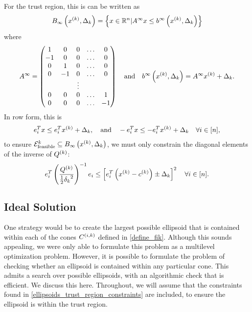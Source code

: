For the trust region, this is can be written as
\begin{align*}
{ B_{\infty}\left(x^{(k)}, \Delta_k\right) } = \left\{ x \in \mathbb R^n | A^{\infty} x\le b^{\infty}\left(x^{(k)}, \Delta_k\right) \right\}
\end{align*}
where
\begin{align}
A^{\infty} = \begin{pmatrix}
 1 &  0 & 0      & \ldots &  0 \\
-1 &  0 & 0      & \ldots &  0 \\
 0 &  1 & 0      & \ldots &  0 \\
 0 & -1 & 0      & \ldots &  0 \\
   &    & \vdots &        &    \\
 0 &  0 &      0 & \ldots &  1 \\
 0 &  0 &      0 & \ldots & -1 \\
\end{pmatrix} \quad \textrm{and} \quad
b^{\infty}\left(x^{(k)}, \Delta_k\right) = A^{\infty} x^{(k)} + \Delta_k. \label{define_atr}
\end{align}
In row form, this is
\begin{align*}
e_i ^T x \le e_i^Tx^{(k)} + \Delta_k, \quad \textrm{and} \quad
-e_i ^T x \le -e_i^Tx^{(k)} + \Delta_k \quad \forall i \in [n],
\end{align*}
to ensure ${\mathcal E^k_{\textrm{feasible}}} \subseteq { B_{\infty}\left(x^{(k)}, \Delta_k\right) }$, we must only constrain the diagonal elements of the inverse of ${Q^{(k)}}$:
\begin{align}
e_i^T\left(\frac{{Q^{(k)}}}{\frac 1 2 {\delta_k}^2}\right)^{-1} e_i \le \left[e_i^T\left(x^{(k)} - {c^{(k)}}\right) \pm \Delta_k \right]^2 \quad \forall i \in [n].
\label{ellipsoids_trust_region_constraints}
\end{align}



\subsection{Ideal Solution}
\label{ideal_ellipsoid_in_polyhedron}

One strategy would be to create the largest possible ellipsoid that is contained within each of the cones ${C^{(i, k)}}$ defined in \cref{define_fik}.
Although this sounds appealing, we were only able to formulate this problem as a multilevel optimization problem.
However, it is possible to formulate the problem of checking whether an ellipsoid is contained within any particular cone.
This admits a search over possible ellipsoids, with an algorithmic check that is efficient.
We discuss this here.
Throughout, we will assume that the constraints found in \cref{ellipsoids_trust_region_constraints} are included, to ensure the ellipsoid is within the trust region.

